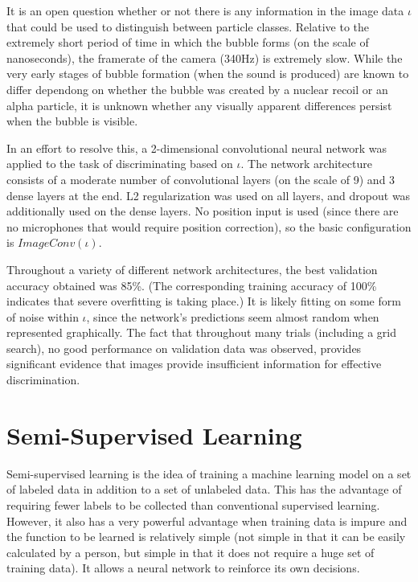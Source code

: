 \documentclass[10pt]{article}
\begin{document}
It is an open question whether or not there is any information in the image data $\iota$ that could be used to distinguish between particle classes. Relative to the extremely short period of time in which the bubble forms (on the scale of nanoseconds), the framerate of the camera (340Hz) is extremely slow. While the very early stages of bubble formation (when the sound is produced) are known to differ dependong on whether the bubble was created by a nuclear recoil or an alpha particle, it is unknown whether any visually apparent differences persist when the bubble is visible.

In an effort to resolve this, a 2-dimensional convolutional neural network was applied to the task of discriminating based on $\iota$. The network architecture consists of a moderate number of convolutional layers (on the scale of 9) and 3 dense layers at the end. L2 regularization was used on all layers, and dropout was additionally used on the dense layers. No position input is used (since there are no microphones that would require position correction), so the basic configuration is $ImageConv(\iota)$.

Throughout a variety of different network architectures, the best validation accuracy obtained was 85\%. (The corresponding training accuracy of 100\% indicates that severe overfitting is taking place.) It is likely fitting on some form of noise within $\iota$, since the network's predictions seem almost random when represented graphically. The fact that throughout many trials (including a grid search), no good performance on validation data was observed, provides significant evidence that images provide insufficient information for effective discrimination.

\section{Semi-Supervised Learning}

Semi-supervised learning is the idea of training a machine learning model on a set of labeled data in addition to a set of unlabeled data. This has the advantage of requiring fewer labels to be collected than conventional supervised learning. However, it also has a very powerful advantage when training data is impure and the function to be learned is relatively simple (not simple in that it can be easily calculated by a person, but simple in that it does not require a huge set of training data). It allows a neural network to reinforce its own decisions.
\end{document}
